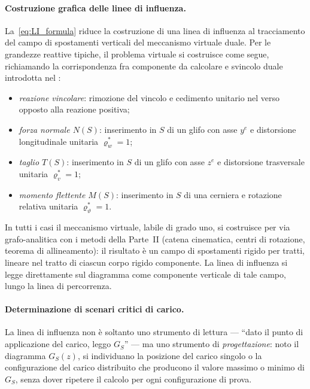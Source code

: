 \paragraph{Costruzione grafica delle linee di influenza.}
La~\eqref{eq:LI_formula} riduce la costruzione di una
linea di influenza al tracciamento del campo di
spostamenti verticali del meccanismo virtuale duale. Per
le grandezze reattive tipiche, il problema virtuale si
costruisce come segue, richiamando la corrispondenza fra
componente da calcolare e svincolo duale introdotta nel
:
\begin{itemize}[noitemsep]
	\item \emph{reazione vincolare}: rimozione del vincolo
	e cedimento unitario nel verso opposto alla reazione
	positiva;
	\item \emph{forza normale $N(S)$}: inserimento in $S$
	di un glifo con asse $y^e$ e distorsione longitudinale
	unitaria $\varrho^*_w = 1$;
	\item \emph{taglio $T(S)$}: inserimento in $S$ di un
	glifo con asse $z^e$ e distorsione trasversale unitaria
	$\varrho^*_v = 1$;
	\item \emph{momento flettente $M(S)$}: inserimento in
	$S$ di una cerniera e rotazione relativa unitaria
	$\varrho^*_\vartheta = 1$.
\end{itemize}
In tutti i casi il meccanismo virtuale, labile di grado
uno, si costruisce per via grafo-analitica con i metodi
della Parte~II (catena cinematica, centri di rotazione,
teorema di allineamento): il risultato è un campo di
spostamenti rigido per tratti, lineare nel tratto di
ciascun corpo rigido componente. La linea di influenza si
legge direttamente sul diagramma come componente
verticale di tale campo, lungo la linea di percorrenza.


\paragraph{Determinazione di scenari critici di carico.}
La linea di influenza non è soltanto uno strumento di lettura
--- ``dato il punto di applicazione del carico, leggo $G_S$'' ---
ma uno strumento di \emph{progettazione}: noto il diagramma
$G_S(z)$, si individuano la posizione del carico singolo o la
configurazione del carico distribuito che producono il valore
massimo o minimo di $G_S$, senza dover ripetere il calcolo per
ogni configurazione di prova.

